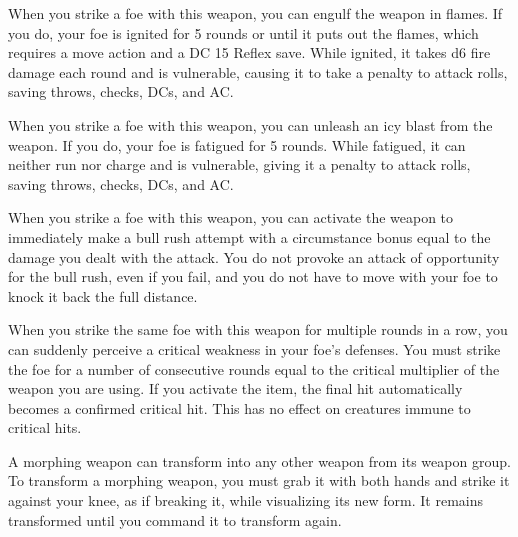  When you strike a foe with this weapon, you can engulf the weapon in flames. If you do, your foe is ignited for 5 rounds or until it puts out the flames, which requires a move action and a DC 15 Reflex save. While ignited, it takes d6 fire damage each round and is vulnerable, causing it to take a  penalty to attack rolls, saving throws, checks, DCs, and AC.


 When you strike a foe with this weapon, you can unleash an icy blast from the weapon. If you do, your foe is fatigued for 5 rounds. While fatigued, it can neither run nor charge and is vulnerable, giving it a  penalty to attack rolls, saving throws, checks, DCs, and AC.


 When you strike a foe with this weapon, you can activate the weapon to immediately make a bull rush attempt with a circumstance bonus equal to the damage you dealt with the attack. You do not provoke an attack of opportunity for the bull rush, even if you fail, and you do not have to move with your foe to knock it back the full distance.


 When you strike the same foe with this weapon for multiple rounds in a row, you can suddenly perceive a critical weakness in your foe's defenses. You must strike the foe for a number of consecutive rounds equal to the critical multiplier of the weapon you are using. If you activate the item, the final hit automatically becomes a confirmed critical hit. This has no effect on creatures immune to critical hits.


 A morphing weapon can transform into any other weapon from its weapon group. To transform a morphing weapon, you must grab it with both hands and strike it against your knee, as if breaking it, while visualizing its new form. It remains transformed until you command it to transform again.

